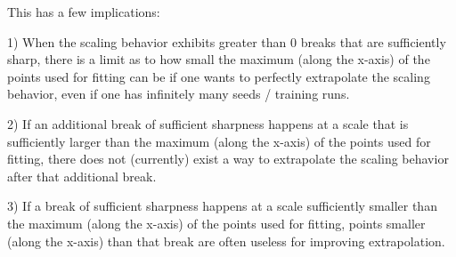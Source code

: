 \documentclass{article} %
\begin{document}
This has a few implications:

\vspace{-1.8mm}

1) When the scaling behavior exhibits greater than 0 breaks that are sufficiently sharp, there is a limit as to how small the maximum (along the x-axis) of the points used for fitting can be if one wants to perfectly extrapolate the scaling behavior, even if one has infinitely many seeds / training runs.

\vspace{-1.8mm}

2) If an additional break of sufficient sharpness happens at a scale that is sufficiently larger than the maximum (along the x-axis) of the points used for fitting, there does not (currently) exist a way to extrapolate the scaling behavior after that additional break.

\vspace{-1.8mm}

3) If a break of sufficient sharpness happens at a scale sufficiently smaller than the maximum (along the x-axis) of the points used for fitting, points smaller (along the x-axis) than that break are often useless for improving extrapolation.




%
\end{document}
